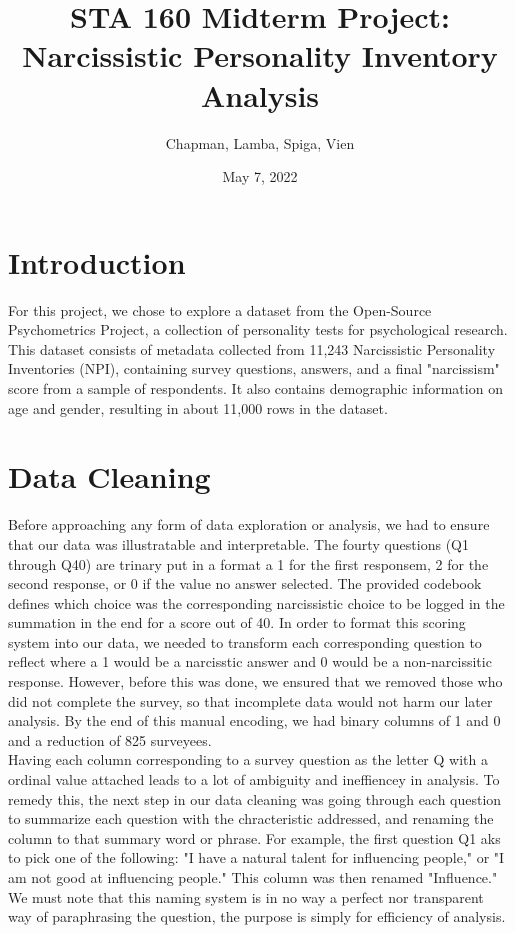 \documentclass{article}
\title{STA 160 Midterm Project: Narcissistic Personality Inventory Analysis}
\author{Chapman, Lamba, Spiga, Vien}
\date{May 7, 2022}
\begin{document}
\maketitle
\tableofcontents
\pagebreak

\section{Introduction}
For this project, we chose to explore a dataset from the Open-Source Psychometrics Project, a collection of personality tests for psychological research. This dataset consists of metadata collected from 11,243 Narcissistic Personality Inventories (NPI), containing survey questions, answers, and a final "narcissism" score from a sample of respondents. It also contains demographic information on age and gender, resulting in about 11,000 rows in the dataset.

\section{Data Cleaning}
Before approaching any form of data exploration or analysis, we had to ensure that our data was illustratable and interpretable. The fourty questions (Q1 through Q40) are trinary put in a format a 1 for the first responsem, 2 for the second response, or 0 if the value no answer selected. The provided codebook defines which choice was the corresponding narcissistic choice to be logged in the summation in the end for a score out of 40. In order to format this scoring system into our data, we needed to transform each corresponding question to reflect where a 1 would be a narcisstic answer and 0 would be a non-narcissitic response. However, before this was done, we ensured that we removed those who did not complete the survey, so that incomplete data would not harm our later analysis. By the end of this manual encoding, we had binary columns of 1 and 0 and a reduction of 825 surveyees. \\

Having each column corresponding to a survey question as the letter Q with a ordinal value attached leads to a lot of ambiguity and ineffiencey in analysis. To remedy this, the next step in our data cleaning was going through each question to summarize each question with the chracteristic addressed, and renaming the column to that summary word or phrase. For example, the first question Q1 aks to pick one of the following: "I have a natural talent for influencing people," or "I am not good at influencing people." This column was then renamed "Influence." We must note that this naming system is in no way a perfect nor transparent way of paraphrasing the question, the purpose is simply for efficiency of analysis. \\
\end{document}
